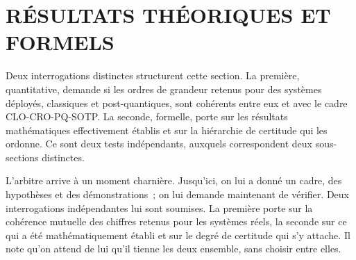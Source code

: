 
\section{R\'ESULTATS TH\'EORIQUES ET FORMELS}
\label{sec:resultats_theoriques}
\begin{sloppypar}
Deux interrogations distinctes structurent cette section. La premi\`ere, quantitative, demande si les ordres de grandeur retenus pour des syst\`emes d\'eploy\'es,
classiques et post-quantiques, sont coh\'erents entre eux et avec le cadre
CLO-CRO-PQ-SOTP. La seconde, formelle, porte sur les r\'esultats math\'ematiques
effectivement \'etablis et sur la hi\'erarchie de certitude qui les ordonne.
Ce sont deux tests ind\'ependants, auxquels correspondent deux sous-sections
distinctes.
\end{sloppypar}

\begin{boiteArbitre}
L'arbitre arrive \`a un moment charni\`ere. Jusqu'ici, on lui a donn\'e un
cadre, des hypoth\`eses et des d\'emonstrations~; on lui demande maintenant de
v\'erifier. Deux interrogations ind\'ependantes lui sont soumises. La
premi\`ere porte sur la coh\'erence mutuelle des chiffres retenus pour les syst\`emes r\'eels,
la seconde sur ce qui a \'et\'e
math\'ematiquement \'etabli et sur le degr\'e de certitude qui s'y attache. Il note qu'on
attend de lui qu'il tienne les deux ensemble, sans choisir entre elles.
\end{boiteArbitre}

